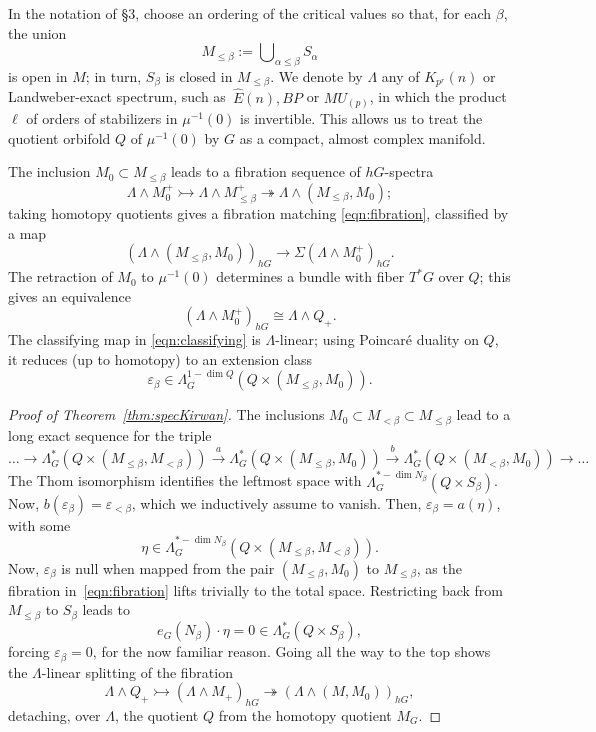 \documentclass[11pt, reqno]{amsart}
\theoremstyle{plain}
\theoremstyle{definition}
\newcommand{\landw}{\Lambda}
\newcommand{\En}{\widehat{E}(n)}
\begin{document}
In the notation of \S3, choose an ordering of the critical values so that, for each $\beta$, 
the union 
\[
M_{\le\beta}:= \bigcup\nolimits_{\alpha\le\beta} S_\alpha
\]
is open in $M$; in turn, $S_{\beta}$ is closed in $M_{\le\beta}$. We denote by $\landw$ any 
of  $K_{p^r}(n)$ or Landweber-exact spectrum, such as~$\En, BP$ or $MU_{(p)}$, in which the product $\ell$ 
of orders of stabilizers in $\mu^{-1}(0)$ is invertible. This allows us to treat the quotient orbifold 
$Q$ of $\mu^{-1}(0)$ by $G$ as a compact, almost complex manifold. 

The  inclusion $M_0\subset M_{\le\beta}$ leads to a fibration sequence of $hG$-spectra
\begin{equation}\label{eqn:fibration}
\landw\wedge M_0^+ \rightarrowtail \landw\wedge M_{\le\beta}^+ \twoheadrightarrow 
\landw\wedge \left(M_{\le\beta},M_0\right);
\end{equation}
taking homotopy quotients gives a fibration matching \eqref{eqn:fibration}, 
classified by a map
\begin{equation}\label{eqn:classifying}
\left(\landw\wedge\left(M_{\le\beta},M_0\right)\right)_{hG} \to 
\Sigma \left(\landw\wedge M_0^+\right)_{hG}.
\end{equation}   
The retraction of $M_0$ to $\mu^{-1}(0)$ determines a bundle with fiber $T^*G$ over $Q$; 
this gives an equivalence
\[
\left(\landw\wedge M^+_0\right)_{hG} 
	\cong \landw\wedge Q_+.
\]  
The classifying map in \eqref{eqn:classifying} is $\landw$-linear; using Poincar\'e duality 
on $Q$, it reduces (up to homotopy) to an extension class
\[
\varepsilon_\beta\in \landw^{1-\dim Q}_{G}\left(Q\times(M_{\le\beta},M_0)\right).
\] 
\begin{proof}[Proof of Theorem~\ref{thm:specKirwan}]
The  inclusions $M_0\subset M_{<\beta} \subset M_{\le\beta}$ 
lead to a long exact sequence for the triple 
\[
\dots \longrightarrow  \landw^*_{G}\left(Q\times (M_{\le\beta},M_{<\beta})\right) 
\xrightarrow{\ a\ }  \landw^*_{G}\left(Q\times (M_{\le\beta},M_0)\right)
\xrightarrow{\ b\ }  \landw^*_{G}\left(Q\times (M_{<\beta},M_0)\right) 
\longrightarrow \dots 
\]
The Thom isomorphism identifies the leftmost space with $\landw^{*-\dim N_\beta}_{G}(Q\times S_\beta)$. Now, $b(\varepsilon_\beta) = \varepsilon_{<\beta}$, which we inductively assume to vanish. Then, 
$\varepsilon_\beta = a(\eta)$, with some 
\[
\eta  \in \landw^{*-\dim N_\beta}_{G}\left(Q\times (M_{\le\beta},M_{<\beta})\right) .
\] 
Now, $\varepsilon_\beta$ is null when mapped from the pair $(M_{\le\beta}, M_0)$ 
to $M_{\le\beta}$, as the fibration in~\eqref{eqn:fibration} lifts trivially to the total space. 
Restricting back from $M_{\le\beta}$ to $S_\beta$ leads to 
\[
e_G(N_\beta)\cdot \eta = 0 \in \landw_G^*(Q\times S_\beta), 
\]
forcing $\varepsilon_\beta=0$, for the now familiar reason. Going all the way to the top shows the 
$\landw$-linear splitting of the fibration
\[
\landw\wedge Q_+ \rightarrowtail 
\left(\landw\wedge M_+\right)_{hG} \twoheadrightarrow \left(\landw\wedge (M,M_0)\right)_{hG},
\]
detaching, over $\landw$, the quotient $Q$ from the homotopy quotient $M_G$. 
\end{proof}
\end{document}
